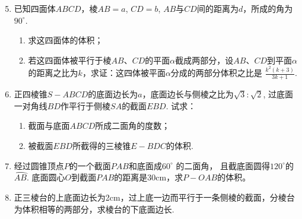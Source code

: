 \begin{enumerate}\setcounter{enumi}{4}
    \item 已知四面体$ABCD$，棱$AB=a$,  $CD=b$,  $AB$与$CD$间的距离为$d$，所成的角为$90^{\circ}$.
\begin{enumerate}[(1)]
    \item 求这四面体的体积；
    \item 
若这四面体被平行于棱$AB$、$CD$的平面$\alpha$截成两部分，设$AB$、$CD$到平面$\alpha$的距离之比为$k$，求证：这四体被平面$\alpha$分成的两部分体积之比是 $\frac{k^{2}(k+3)}{3k+1}$.
\end{enumerate}

\noindent
\begin{minipage}{.45\textwidth}
\centering
{}
\end{minipage}\hfill
\begin{minipage}{.45\textwidth}
\centering
{}
\end{minipage}

\item 正四棱锥$S-ABCD$的底面边长为$a$，底面边长与侧棱之比为$\sqrt{3}:\sqrt{2}$, 过底面一对角线$BD$作平行于侧棱$SA$的截面$EBD$. 试求：
\begin{enumerate}[(1)]
   \item 截面与底面$ABCD$所成二面角的度数；
    \item 被截面$EBD$所截得的三棱锥$E-BDC$的体积.
\end{enumerate}


\item 经过圆锥顶点$P$的一个截面$PAB$和底面成$60^{\circ}$ 的二面角，
且截底面圆得$ 120^{\circ} $的$ \wideparen{AB}$. 底面圆心$O$到截面$PAB$的距离是30cm，求$P-OAB$的体积。
\item 正三棱台的上底面边长为2cm，过上底一边而平行于一条侧棱的截面，分棱台为体积相等的两部分，求棱台的下底面边长.


\end{enumerate}
